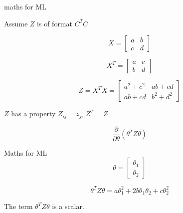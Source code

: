 \documentclass{beamer}
\begin{document}
\begin{frame}{maths for ML}


Assume $Z$ is of format $C^{T}C$

\begin{equation*}
    X = \begin{bmatrix}
    a&b\\
    c&d
    \end{bmatrix}
\end{equation*}

\begin{equation*}
    X^{T} = \begin{bmatrix}
    a&c\\
    b&d
    \end{bmatrix}
\end{equation*}

\begin{equation*}
    Z = X^{T}X =  \begin{bmatrix}
    a^{2}+c^{2}&ab+cd\\
    ab+cd&b^{2}+d^{2}
    \end{bmatrix}
\end{equation*}

$Z$ has a property $Z_{ij}=z_{ji}$ \implies $Z^{T}=Z$

\begin{equation*}
    \frac{\partial}{ \partial \theta} (\theta^{T}Z\theta)
\end{equation*}
    
\end{frame}


\begin{frame}{Maths for ML}
    \begin{equation*}
        \theta = \begin{bmatrix}
        \theta_{1}\\
        \theta_{2}
        \end{bmatrix}
    \end{equation*}
    
    \begin{equation*}
        \theta^{T}Z\theta = a\theta_{1}^{2} + 2b\theta_{1}\theta_{2}+c\theta_{2}^{2} 
    \end{equation*}

The term $\theta^{T}Z\theta$ is a scalar.

\end{frame}
\end{document}
